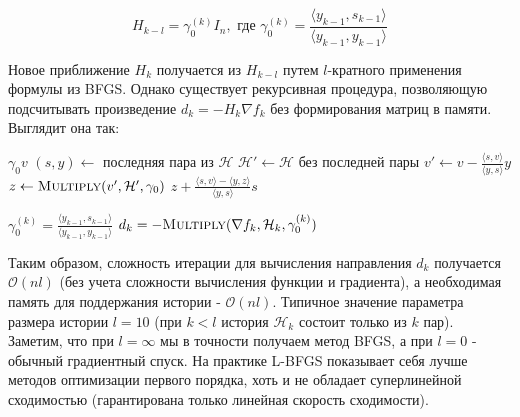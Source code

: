 $$
H_{k-l} = \gamma_0^{(k)} I_n, \text{ где } \gamma_0^{(k)} = \frac{\langle y_{k-1}, s_{k-1} \rangle}{\langle y_{k-1}, y_{k-1} \rangle}
$$

Новое приближение $H_k$ получается из $H_{k-l}$ путем $l$-кратного применения формулы из BFGS. Однако существует рекурсивная процедура, позволяющую подсчитывать произведение $d_k = -H_k \nabla f_k$ без формирования матриц в памяти. Выглядит она так:

\begin{algorithm}[H]
    \begin{algorithmic}[1]
                \Return $\gamma_0 v$
            \EndIf
            \State $(s, y) \gets \text{ последняя пара из } \mathcal{H}$
            \State $\mathcal{H}' \gets \mathcal{H} \text{ без последней пары}$
            \State $v' \gets v - \frac{\langle s, v \rangle}{\langle y, s \rangle} y$
            \State $z \gets \textsc{Multiply}(v', \mathcal{H}', \gamma_0)$
            \State \Return $z + \frac{\langle s, v \rangle - \langle y, z \rangle}{\langle y, s \rangle} s$
        \EndProcedure

        \State $\gamma_0^{(k)} = \frac{\langle y_{k-1}, s_{k-1} \rangle}{\langle y_{k-1}, y_{k-1} \rangle}$
        \State $d_k = -\textsc{Multiply}(\nabla f_k, \mathcal{H}_k, \gamma_0^{(k)})$
    \end{algorithmic}
\end{algorithm}

Таким образом, сложность итерации для вычисления направления $d_k$ получается $\mathcal{O}(nl)$ (без учета сложности вычисления функции и градиента), а необходимая память для поддержания истории - $\mathcal{O}(nl)$. Типичное значение параметра размера истории $l=10$ (при $k < l$ история $\mathcal{H}_k$ состоит только из $k$ пар). Заметим, что при $l=\infty$ мы в точности получаем метод BFGS, а при $l=0$ - обычный градиентный спуск. На практике L-BFGS показывает себя лучше методов оптимизации первого порядка, хоть и не обладает суперлинейной сходимостью (гарантирована только линейная скорость сходимости).
